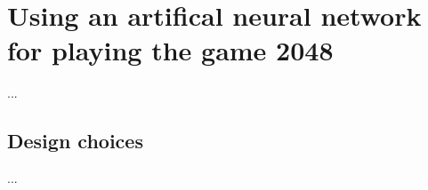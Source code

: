 
\section{Using an artifical neural network for playing the game 2048}
...

\subsection{Design choices}
...
